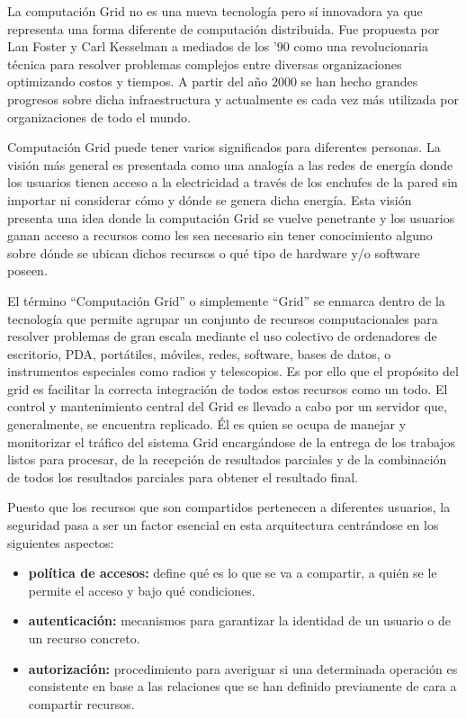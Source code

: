 La computación Grid no es una nueva tecnología pero sí innovadora ya que representa una forma diferente de computación distribuida. Fue propuesta por Lan Foster y Carl Kesselman a mediados de los '90 como una revolucionaria técnica para resolver problemas complejos entre diversas organizaciones optimizando costos y tiempos. A partir del año 2000 se han hecho grandes progresos sobre dicha infraestructura y actualmente es cada vez más utilizada por organizaciones de todo el mundo.

Computación Grid puede tener varios significados para diferentes personas. La visión más general es presentada como una analogía a las redes de energía donde los usuarios tienen acceso a la electricidad a través de los enchufes de la pared sin importar ni considerar cómo y dónde se genera dicha energía. Esta visión presenta una idea donde la computación Grid se vuelve penetrante y los usuarios ganan acceso a recursos como les sea necesario sin tener conocimiento alguno sobre dónde se ubican dichos recursos o qué tipo de hardware y/o software poseen.

El término “Computación Grid” o simplemente “Grid” se enmarca dentro de la tecnología que permite agrupar un conjunto de recursos computacionales para resolver problemas de gran escala mediante el uso colectivo de ordenadores de escritorio, PDA, portátiles, móviles, redes, software, bases de datos, o instrumentos especiales como radios y telescopios. Es por ello que el propósito del grid es facilitar la correcta integración de todos estos recursos como un todo.
El control y mantenimiento central del Grid es llevado a cabo por un servidor que, generalmente, se encuentra replicado. Él es quien se ocupa de manejar y monitorizar el tráfico del sistema Grid encargándose de la entrega de los trabajos listos para procesar, de la recepción de resultados parciales y de la combinación de todos los resultados parciales para obtener el resultado final.

Puesto que los recursos que son compartidos pertenecen a diferentes usuarios, la seguridad pasa a ser un factor esencial en esta arquitectura centrándose en los siguientes aspectos:

\begin{itemize}
 \item \textbf{política de accesos:} define qué es lo que se va a compartir, a quién se le permite el acceso y bajo qué condiciones.
 \item \textbf{autenticación:} mecanismos para garantizar la identidad de un usuario o de un recurso concreto.
 \item \textbf{autorización:} procedimiento para averiguar si una determinada operación es consistente en base a las relaciones que se han definido previamente de cara a compartir recursos.
\end{itemize}

